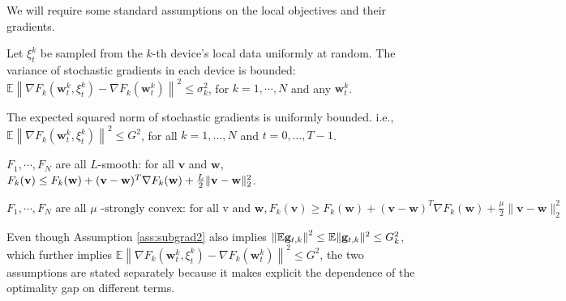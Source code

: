 We will require some standard assumptions on the local objectives and their gradients. 

\begin{assumption}
	Let $\xi_{t}^{k}$ be sampled from the $k$-th device's local data uniformly at random. The variance of stochastic gradients in each device is bounded: $\mathbb{E}\left\|\nabla F_{k}\left(\mathbf{w}_{t}^{k}, \xi_{t}^{k}\right)-\nabla F_{k}\left(\mathbf{w}_{t}^{k}\right)\right\|^{2} \leq \sigma_{k}^{2}$,
	for $k=1, \cdots, N$ and any $\mathbf{w}_{t}^{k}$.
\end{assumption}

\begin{assumption}
	The expected squared norm of stochastic gradients is uniformly bounded. i.e.,
	$\mathbb{E}\left\|\nabla F_{k}\left(\mathbf{w}_{t}^{k}, \xi_{t}^{k}\right)\right\|^{2} \leq G^{2}$, for all $k = 1,..., N$ and $t=0, \dots, T-1$.
	\label{ass:subgrad2}
\end{assumption}

\begin{assumption}[L-smooth]
	$F_{1}, \cdots, F_{N}$ are all $L$-smooth: for all  $\mathbf{v}$  and $\mathbf{w}$, $F_{k}(\mathbf{v}) \leq F_{k}(\mathbf{w})+(\mathbf{v}- \\ \mathbf{w})^{T} \nabla F_{k}(\mathbf{w})+\frac{L}{2}\|\mathbf{v}-\mathbf{w}\|_{2}^{2}$.
	\label{ass:lsmooth}
\end{assumption}

\begin{assumption}
	$	F_{1}, \cdots, F_{N} \text { are all } \mu \text { -strongly convex: for all v and } \mathbf{w}, F_{k}(\mathbf{v}) \geq F_{k}(\mathbf{w})+(\mathbf{v}-\mathbf{w})^{T} \nabla F_{k}(\mathbf{w})+\frac{\mu}{2}\|\mathbf{v}-\mathbf{w}\|_{2}^{2}$
	\label{ass:stroncvx}
\end{assumption}

Even though Assumption \ref{ass:subgrad2} also implies $\left\| \mathbb{E}{\mathbf{g}}_{t,k}\right\|^2  \leq \mathbb{E}\|{\mathbf{g}}_{t,k}\|^2 \leq G_k^2$, which further implies $\mathbb{E}\left\|\nabla F_{k}\left(\mathbf{w}_{t}^{k}, \xi_{t}^{k}\right)-\nabla F_{k}\left(\mathbf{w}_{t}^{k}\right)\right\|^{2} \leq G^2$, the two assumptions are stated separately because it makes explicit the dependence of the optimality gap on different terms. 


